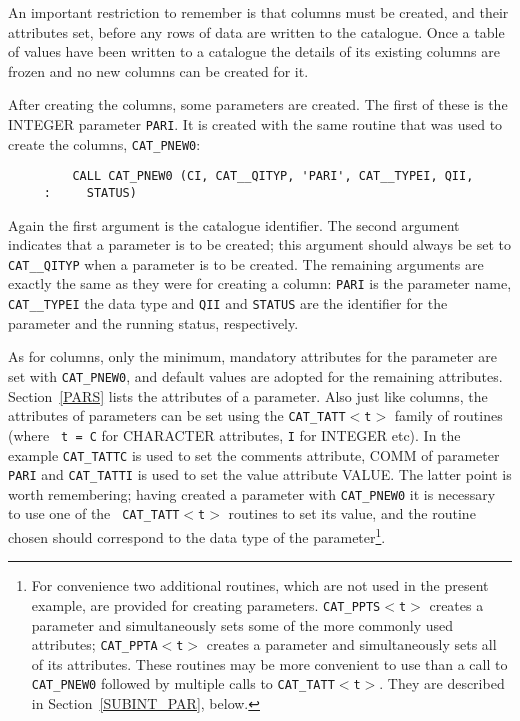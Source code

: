 An important restriction to remember is that columns must be created,
and their attributes set, before any rows of data are written to the
catalogue. Once a table of values have been written to a catalogue the
details of its existing columns are frozen and no new columns can be
created for it.

After creating the columns, some parameters are created. The first of
these is the INTEGER parameter {\tt PARI}. It is created with the same
routine that was used to create the columns, {\tt CAT\_PNEW0}:

\begin{verbatim}
         CALL CAT_PNEW0 (CI, CAT__QITYP, 'PARI', CAT__TYPEI, QII,
     :     STATUS)
\end{verbatim}

Again the first argument is the catalogue identifier. The second
argument indicates that a parameter is to be created; this argument
should always be set to {\tt CAT\_\_QITYP} when a parameter is to be
created. The remaining arguments are exactly the same as they were for
creating a column: {\tt PARI} is the parameter name, {\tt CAT\_\_TYPEI}
the data type and {\tt QII} and {\tt STATUS} are the identifier for the
parameter and the running status, respectively.

As for columns, only the minimum, mandatory attributes for the parameter
are set with {\tt CAT\_PNEW0}, and default values are adopted for the
remaining attributes. Section~\ref{PARS} lists the attributes of a
parameter. Also just like columns, the attributes of parameters can be
set using the {\tt CAT\_TATT$<$t$>$} family of routines (where {\tt
t = C} for CHARACTER attributes, {\tt I} for INTEGER etc). In the
example {\tt CAT\_TATTC} is used to set the comments attribute, COMM of
parameter {\tt PARI} and {\tt CAT\_TATTI} is used to set the value
attribute VALUE. The latter point is worth remembering; having created
a parameter with {\tt CAT\_PNEW0} it is necessary to use one of the {\tt
CAT\_TATT$<$t$>$} routines to set its value, and the routine chosen
should correspond to the data type of the parameter\footnote{For
convenience two additional routines, which are not used in the present
example, are provided for creating parameters. {\tt CAT\_PPTS$<$t$>$}
creates a parameter and simultaneously sets some of the more commonly
used attributes; {\tt CAT\_PPTA$<$t$>$} creates a parameter and
simultaneously sets all of its attributes. These routines may be more
convenient to use than a call to {\tt CAT\_PNEW0} followed by multiple
calls to {\tt CAT\_TATT$<$t$>$}. They are described in
Section~\ref{SUBINT_PAR}, below.}.

